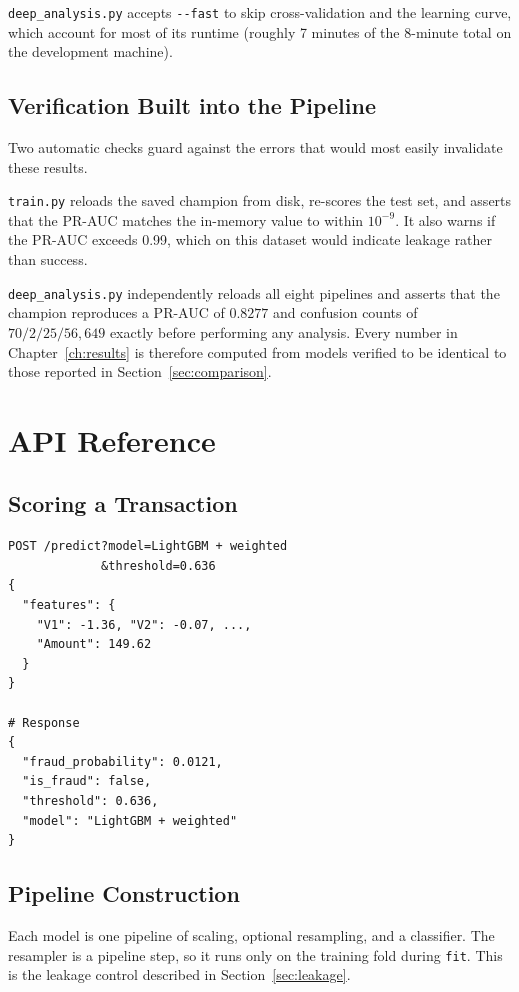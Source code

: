 \texttt{deep\_\allowbreak analysis.py} accepts \texttt{-{}-fast} to skip cross-validation and the
learning curve, which account for most of its runtime (roughly 7 minutes of the 8-minute
total on the development machine).

\subsection{Verification Built into the Pipeline}

Two automatic checks guard against the errors that would most easily invalidate these
results.

\texttt{train.py} reloads the saved champion from disk, re-scores the test set, and asserts
that the PR-AUC matches the in-memory value to within $10^{-9}$. It also warns if the
PR-AUC exceeds 0.99, which on this dataset would indicate leakage rather than success.

\texttt{deep\_\allowbreak analysis.py} independently reloads all eight pipelines and asserts that the
champion reproduces a PR-AUC of $0.8277$ and confusion counts of $70/2/25/56{,}649$ exactly
before performing any analysis. Every number in Chapter~\ref{ch:results} is therefore
computed from models verified to be identical to those reported in
Section~\ref{sec:comparison}.

\section{API Reference}
\label{app:api}

\subsection{Scoring a Transaction}

{\footnotesize
\begin{verbatim}
POST /predict?model=LightGBM + weighted
             &threshold=0.636
{
  "features": {
    "V1": -1.36, "V2": -0.07, ...,
    "Amount": 149.62
  }
}

# Response
{
  "fraud_probability": 0.0121,
  "is_fraud": false,
  "threshold": 0.636,
  "model": "LightGBM + weighted"
}
\end{verbatim}
}

\subsection{Pipeline Construction}

Each model is one pipeline of scaling, optional resampling, and a classifier. The resampler
is a pipeline step, so it runs only on the training fold during \texttt{fit}. This is the
leakage control described in Section~\ref{sec:leakage}.


